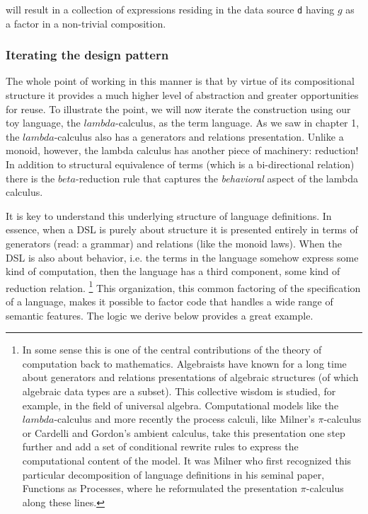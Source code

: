 will result in a collection of expressions residing in the data source
\lstinline[language=Scala,mathescape=true]!d! having $g$ as a factor
in a non-trivial composition.

\subsubsection{Iterating the design pattern}

The whole point of working in this manner is that by virtue of its
compositional structure it provides a much higher level of abstraction
and greater opportunities for reuse. To illustrate the point, we will
now iterate the construction using our toy language, the
$lambda$-calculus, as the term language. As we saw in chapter 1, the
$lambda$-calculus also has a generators and relations
presentation. Unlike a monoid, however, the lambda calculus has
another piece of machinery: reduction! In addition to structural
equivalence of terms (which is a bi-directional relation) there is the
$beta$-reduction rule that captures the \emph{behavioral} aspect of
the lambda calculus.

It is key to understand this underlying structure of language
definitions. In essence, when a DSL is purely about structure it is
presented entirely in terms of generators (read: a grammar) and
relations (like the monoid laws). When the DSL is also about behavior,
i.e. the terms in the language somehow express some kind of
computation, then the language has a third component, some kind of
reduction relation. \footnote{In some sense this is one of the central
  contributions of the theory of computation back to
  mathematics. Algebraists have known for a long time about generators
  and relations presentations of algebraic structures (of which
  algebraic data types are a subset). This collective wisdom is
  studied, for example, in the field of universal
  algebra. Computational models like the $lambda$-calculus and more
  recently the process calculi, like Milner's $\pi$-calculus or
  Cardelli and Gordon's ambient calculus, take this presentation one
  step further and add a set of conditional rewrite rules to express
  the computational content of the model. It was Milner who first
  recognized this particular decomposition of language definitions in
  his seminal paper, Functions as Processes, where he reformulated the
  presentation $\pi$-calculus along these lines.} This organization,
this common factoring of the specification of a language, makes it
possible to factor code that handles a wide range of semantic
features. The logic we derive below provides a great example.

